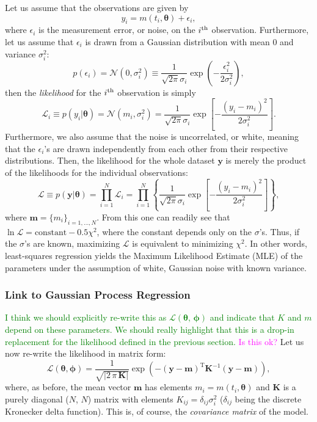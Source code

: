 \documentclass[letterpaper]{ar-1col}
\newcommand{\suz}[1]{\textcolor{magenta}{#1}}
\newcommand{\dan}[1]{\textcolor{green}{#1}}
\newcommand{\hyperparams}{\ensuremath{\boldsymbol{\phi}}}
\newcommand{\meanparams}{\ensuremath{\boldsymbol{\theta}}}
\begin{document}
Let us assume that the observations are given by
\begin{equation}
  y_i=m(t_i,\meanparams)+\epsilon_i,
\end{equation}
where $\epsilon_i$ is the measurement error, or noise, on the $i^{\rm th}$ observation. Furthermore, let us assume that $\epsilon_i$ is drawn from a Gaussian distribution with mean $0$ and variance $\sigma_i^2$:
\begin{equation}
  p(\epsilon_i)=\mathcal{N}(0,\sigma_i^2) \equiv \frac{1}{\sqrt{2\pi} \sigma_i} \exp\left(-\frac{\epsilon_i^2}{2\sigma_i^2} \right),
\end{equation}
then the \emph{likelihood} for the $i^{\rm th}$ observation is simply
\begin{equation}
  \mathcal{L}_i\equiv p(y_i|\meanparams)=\mathcal{N}(m_i,\sigma_i^2) =\frac{1}{\sqrt{2\pi} \sigma_i} \exp\left[-\frac{(y_i-m_i)^2}{2\sigma_i^2} \right].
\end{equation}
Furthermore, we also assume that the noise is uncorrelated, or white, meaning that the $\epsilon_i$'s are drawn independently from each other from their respective distributions. Then, the likelihood for the whole dataset $\mathbf{y}$ is merely the product of the likelihoods for the individual observations:
\begin{equation}
  \mathcal{L} \equiv p(\mathbf{y}|\meanparams) = \prod_{i=1}^N \mathcal{L}_i = \prod_{i=1}^N \left\{ \frac{1}{\sqrt{2\pi} \sigma_i}
  \exp\left[-\frac{(y_i-m_i)^2}{2\sigma_i^2} \right] \right\},
\end{equation}
where $\mathbf{m}=\{m_i\}_{i=1,\ldots,N}$. From this one can readily see that $\ln \mathcal{L} = \mathrm{constant} - 0.5 \chi^2$, where the constant depends only on the $\sigma$'s. Thus, if the $\sigma$'s are known, maximizing $\mathcal{L}$ is equivalent to minimizing $\chi^2$. In other words, least-squares regression yields the Maximum Likelihood Estimate (MLE) of the parameters under the assumption of white, Gaussian noise with known variance.

\subsubsection{Link to Gaussian Process Regression}\label{sec:gp-lsq-link}
\dan{I think we should explicitly re-write this as $\mathcal{L}(\meanparams,\,\hyperparams)$ and indicate that $K$ and $m$ depend on these parameters. We should really highlight that this is a drop-in replacement for the likelihood defined in the previous section.} \suz{Is this ok?}
Let us now re-write the likelihood in matrix form:
\begin{equation}
\label{eq:gp_like}
  \mathcal{L}(\meanparams,\hyperparams) = 
  \frac{1}{\sqrt{|2\,\pi\,\mathbf{K}|}} \exp \left(-(\mathbf{y}-\mathbf{m})^{\mathrm{T}} \mathbf{K}^{-1}
  (\mathbf{y}-\mathbf{m}) \right),
\end{equation}
where, as before, the mean vector $\mathbf{m}$ has elements $m_i=m(t_i,\meanparams)$ and $\mathbf{K}$ is a purely diagonal ($N$, $N$) matrix with elements $K_{ij} = \delta_{ij} \sigma_i^2$ ($\delta_{ij}$ being the discrete Kronecker delta function). This is, of course, the \emph{covariance matrix} of the model.
\end{document}
